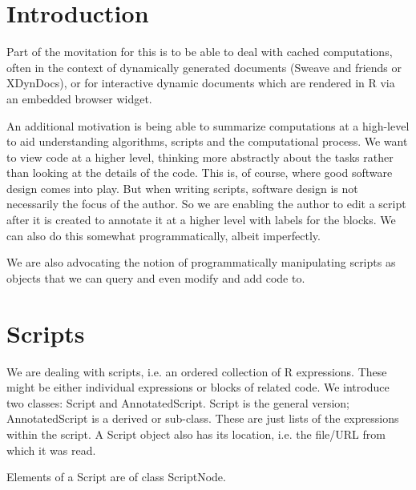 \documentclass{article}
\begin{document}
\section{Introduction}
Part of the movitation for this is to be able to deal
with cached computations, often in the context of dynamically
generated documents (Sweave and friends or XDynDocs),
or for interactive dynamic documents which are rendered
in R via an embedded browser widget.

An additional motivation is being able to summarize computations at a
high-level to aid understanding algorithms, scripts and the
computational process.  We want to view code at a higher level,
thinking more abstractly about the tasks rather than looking at the
details of the code.  This is, of course, where good software design
comes into play. But when writing scripts, software design is not
necessarily the focus of the author.  So we are enabling the author to
edit a script after it is created to annotate it at a higher level
with labels for the blocks.  We can also do this somewhat
programmatically, albeit imperfectly.

We are also advocating the notion of programmatically manipulating
scripts as objects that we can query and even modify and add code to.

\section{Scripts}
We are dealing with scripts, i.e. an ordered collection of R
expressions. These might be either individual expressions or blocks of
related code.  We introduce two classes: Script and AnnotatedScript.
Script is the general version; AnnotatedScript is a derived or
sub-class.  These are just lists of the expressions within the script.
A Script object also has its location, i.e. the file/URL from which it
was read.

Elements of a Script are of class ScriptNode.
\end{document}
